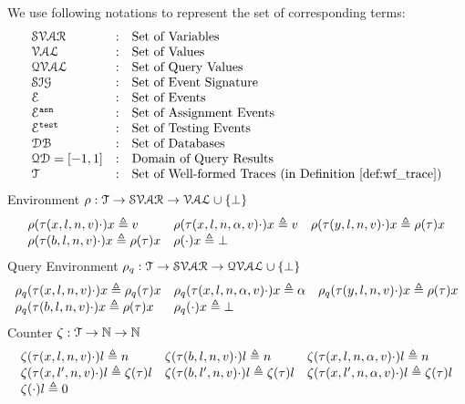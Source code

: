 We use following notations to represent the set of corresponding terms:
\[
\begin{array}{lll}
\mathcal{SVAR} & : & \mbox{Set of Variables}  
\\ 
%
\mathcal{VAL} & : & \mbox{Set of Values} 
\\ 
%
\mathcal{QVAL} & : & \mbox{Set of Query Values} 
\\ 
%
\mathcal{SIG} & : & \mbox{Set of Event Signature} 
\\ 
%
\eventset  & : & \mbox{Set of Events}  
\\
%
%
\eventset^{\asn}  & : & \mbox{Set of Assignment Events}  
\\
%
\eventset^{\test}  & : & \mbox{Set of Testing Events}  
\\
%
\dbdom  & : & \mbox{{Set of Databases}} 
\\
%
\qdom = {[-1,1]} & : & \mbox{{Domain of Query Results}}
\\
%
\mathcal{T} & : & \mbox{Set of Well-formed Traces (in Definition~\ref{def:wf_trace})}
\end{array}
\]
%
%
%
Environment $ \rho : \mathcal{T}  \to \mathcal{SVAR} \to \mathcal{VAL} \cup \{\bot\}$
\[
\begin{array}{lll}
\rho(\mathtt{\tau} (x, l, n, v) \cdot ) x \triangleq v
&
\rho(\mathtt{\tau} (x, l, n, \alpha, v) \cdot) x \triangleq v
&
\rho(\mathtt{\tau} (y, l, n, v)\cdot ) x \triangleq \rho(\mathtt{\tau}) x
\\
\rho(\mathtt{\tau} (b, l, n, v)\cdot ) x \triangleq \rho(\mathtt{\tau}) x
&
\rho(\cdot ) x \triangleq \bot
&
\end{array}
\]
%
%
Query Environment $\rho_{q}: \mathcal{T}  \to \mathcal{SVAR} \to \mathcal{QVAL} \cup \{\bot\}$
\[
\begin{array}{lll}
\rho_{q}(\mathtt{\tau} (x, l, n, v) \cdot ) x \triangleq \rho_{q}(\mathtt{\tau}) x
&
\rho_{q}(\mathtt{\tau} (x, l, n, \alpha, v) \cdot ) x \triangleq \alpha
&
\rho_{q}(\mathtt{\tau} (y, l, n, v)\cdot ) x \triangleq \rho(\mathtt{\tau}) x
\\
\rho_{q}(\mathtt{\tau} (b, l, n, v)\cdot ) x \triangleq \rho(\mathtt{\tau}) x
&
\rho_{q}(\cdot ) x \triangleq \bot
&
\end{array}
\]
%
Counter $\mathtt{\zeta} : \mathcal{T}  \to \mathbb{N} \to \mathbb{N}$
\[
\begin{array}{lll}
\mathtt{\zeta}(\mathtt{\tau} (x, l, n, v) \cdot ) l \triangleq n
&
\mathtt{\zeta}(\mathtt{\tau} (b, l, n, v) \cdot) l \triangleq n
&
\mathtt{\zeta}(\mathtt{\tau} (x, l, n, \alpha, v) \cdot) l \triangleq n
\\
\mathtt{\zeta}(\mathtt{\tau} (x, l', n, v) \cdot ) l \triangleq \mathtt{\zeta}(\mathtt{\tau} ) l
&
\mathtt{\zeta}(\mathtt{\tau} (b, l', n, v) \cdot) l \triangleq \mathtt{\zeta}(\mathtt{\tau} ) l
&
\mathtt{\zeta}(\mathtt{\tau} (x, l', n, \alpha, v) \cdot) l \triangleq \mathtt{\zeta}(\mathtt{\tau} ) l
\\
\mathtt{\zeta}(\cdot) l \triangleq 0
&&
\end{array}
\]
%
